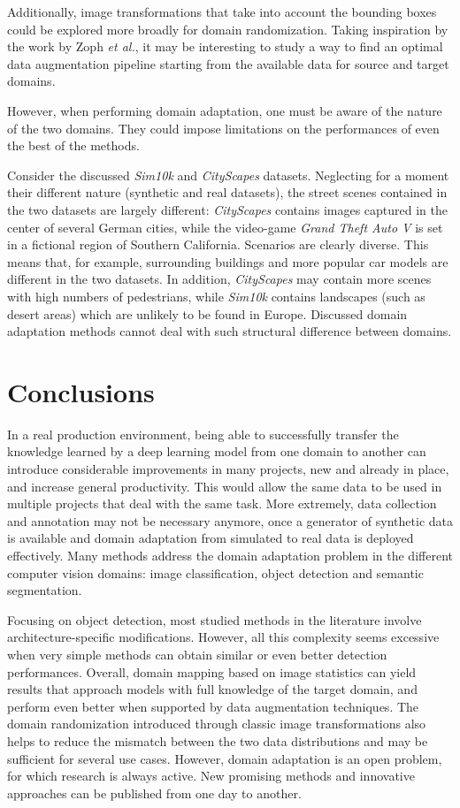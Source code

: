 \documentclass[%
    corpo=12pt,
    twoside,
    stile=classica,   
    tipotesi=magistrale,
    evenboxes,
    english,
	numerazioneromana,
]{toptesi}
\begin{document}
\medskip
Additionally, image transformations that take into account the bounding boxes could be explored more broadly for domain randomization. Taking inspiration by the work by Zoph \textit{et al.}\cite{zoph2019learning}, it may be interesting to study a way to find an optimal data augmentation pipeline starting from the available data for source and target domains.

\bigskip
However, when performing domain adaptation, one must be aware of the nature of the two domains. They could impose limitations on the performances of even the best of the methods.

Consider the discussed \textit{Sim10k} and \textit{CityScapes} datasets. Neglecting for a moment their different nature (synthetic and real datasets), the street scenes contained in the two datasets are largely different: \textit{CityScapes} contains images captured in the center of several German cities, while the video-game \textit{Grand Theft Auto V} is set in a fictional region of Southern California. Scenarios are clearly diverse. This means that, for example, surrounding buildings and more popular car models are different in the two datasets. In addition, \textit{CityScapes} may contain more scenes with high numbers of pedestrians, while \textit{Sim10k} contains landscapes (such as desert areas) which are unlikely to be found in Europe. Discussed domain adaptation methods cannot deal with such structural difference between domains.


\chapter{Conclusions}
In a real production environment, being able to successfully transfer the knowledge learned by a deep learning model from one domain to another can introduce considerable improvements in many projects, new and already in place, and increase general productivity. This would allow the same data to be used in multiple projects that deal with the same task. More extremely, data collection and annotation may not be necessary anymore, once a generator of synthetic data is available and domain adaptation from simulated to real data is deployed effectively. Many methods address the domain adaptation problem in the different computer vision domains: image classification, object detection and semantic segmentation.

\bigskip
Focusing on object detection, most studied methods in the literature involve architecture-specific modifications. However, all this complexity seems excessive when very simple methods can obtain similar or even better detection performances. Overall, domain mapping based on image statistics can yield results that approach models with full knowledge of the target domain, and perform even better when supported by data augmentation techniques. The domain randomization introduced through classic image transformations also helps to reduce the mismatch between the two data distributions and may be sufficient for several use cases. However, domain adaptation is an open problem, for which research is always active. New promising methods and innovative approaches can be published from one day to another.


\backmatter
\english
\printbibliography[heading=bibintoc]
\end{document}
